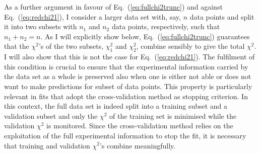 \documentclass[10pt,a4paper]{article}
\begin{document}
As a further argument in favour of Eq.~(\ref{eq:fullchi2trunc}) and
against Eq.~(\ref{eq:redchi21}), I consider a larger data set with,
say, $n$ data points and split it into two subsets with $n_1$ and
$n_2$ data points, respectively, such that $n_1+n_2=n$. As I will
explicitly show below, Eq.~(\ref{eq:fullchi2trunc}) guarantees that
the $\chi^2$'s of the two subsets, $\chi_1^2$ and $\chi_2^2$, combine
sensibly to give the total $\chi^2$. I will also show that this is not
the case for Eq.~(\ref{eq:redchi21}). The fulfilment of this condition
is crucial to ensure that the experimental information carried by the
data set as a whole is preserved also when one is either not able or
does not want to make predictions for subset of data points. This
property is particularly relevant in fits that adopt the
cross-validation method as stopping criterion. In this context, the
full data set is indeed split into a training subset and a validation
subset and only the $\chi^2$ of the training set is minimised while
the validation $\chi^2$ is monitored. Since the cross-validation
method relies on the exploitation of the full experimental information
to stop the fit, it is necessary that training and validation
$\chi^2$'s combine meaningfully.
\end{document}

